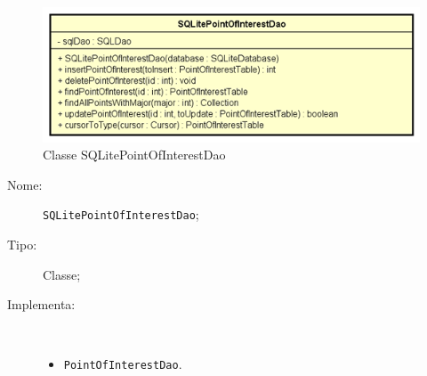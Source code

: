\documentclass[../DefinizioneDiProdotto.tex]{subfiles}
\begin{document}
    \begin{figure}[H]
        \centering
        \includegraphics{img/SQLitePointOfInterestDao.png}
        \caption{Classe SQLitePointOfInterestDao}\label{fig:model::dataaccess::dao::SQLitePointOfInterestDao} 
    \end{figure}
    \begin{description}
\item[Nome:] \texttt{SQLitePointOfInterestDao};
\item[Tipo:] Classe;
\item[Implementa:] \
\begin{itemize}
\item \texttt{PointOfInterestDao}.


\end{itemize}
\end{description}
\end{document}
